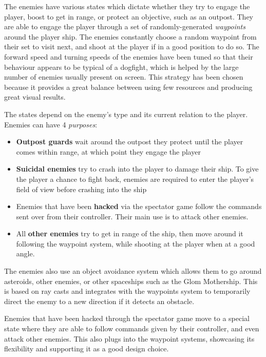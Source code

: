 \documentclass[a4paper,11pt]{article}
\begin{document}
The enemies have various states which dictate whether they try to engage the player, boost to get in range, or protect an objective, such as an outpost. They are able to engage the player through a set of randomly-generated \emph{waypoints} around the player ship. The enemies constantly choose a random waypoint from their set to visit next, and shoot at the player if in a good position to do so. The forward speed and turning speeds of the enemies have been tuned so that their behaviour appears to be typical of a dogfight, which is helped by the large number of enemies usually present on screen. This strategy has been chosen because it provides a great balance between using few resources and producing great visual results.

The states depend on the enemy’s type and its current relation to the player. Enemies can have 4 \emph{purposes}:

\begin{itemize}[noitemsep,topsep=.5ex]
	\item \textbf{Outpost guards} wait around the outpost they protect until the player comes within range, at which point they engage the player
	\item \textbf{Suicidal enemies} try to crash into the player to damage their ship. To give the player a chance to fight back, enemies are required to enter the player’s field of view before crashing into the ship
	\item Enemies that have been \textbf{hacked} via the spectator game follow the commands sent over from their controller. Their main use is to attack other enemies.
	\item All \textbf{other enemies} try to get in range of the ship, then move around it following the waypoint system, while shooting at the player when at a good angle.
\end{itemize}

The enemies also use an object avoidance system which allows them to go around asteroids, other enemies, or other spaceships such as the Glom Mothership. This is based on ray casts and integrates with the waypoints system to temporarily direct the enemy to a new direction if it detects an obstacle.

Enemies that have been hacked through the spectator game move to a special state where they are able to follow commands given by their controller, and even attack other enemies. This also plugs into the waypoint systems, showcasing its flexibility and supporting it as a good design choice.
\end{document}
